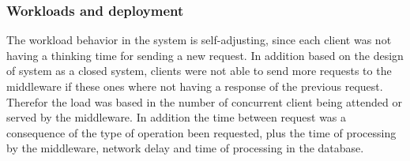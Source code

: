 \subsubsection{Workloads and deployment}\label{sec:workloads-and-deployment}
 The workload behavior in the system is self-adjusting, since each client was not having a thinking time for sending a new request. In addition based on the design of system as a closed system, clients were not able to send more requests to the middleware if these ones where not having a response of the previous request. Therefor the load was based in the number of concurrent client being attended or served by the middleware. In addition the time between request was a consequence of the type of operation been requested, plus the time of processing by the middleware, network delay and time of processing in the database.\\
